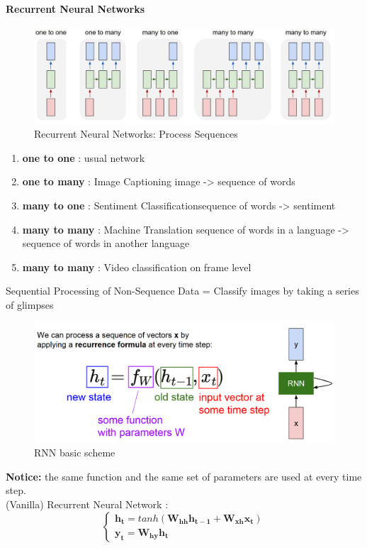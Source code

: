 \documentclass[11pt]{article}
\begin{document}
\paragraph{Recurrent Neural Networks}
\begin{figure}[h]
\centering
\captionsetup{justification=centering}
\includegraphics[width=0.9\linewidth]{L910.pdf}
\caption{ Recurrent Neural Networks: Process Sequences}
\label{fig:L910}
\end{figure}
\begin{enumerate}
    \item \textbf{one to one} : usual network
    \item \textbf{one to many} : Image Captioning image -> sequence of words
    \item \textbf{many to one} : Sentiment Classificationsequence of words -> sentiment
    \item \textbf{many to many} : Machine Translation sequence of words in a language -> sequence of words in another language
    \item \textbf{many to many} : Video classification on frame level
\end{enumerate}{}
Sequential Processing of Non-Sequence Data = Classify images by taking a series of glimpses
\begin{figure}[h]
\centering
\captionsetup{justification=centering}
\includegraphics[width=0.8\linewidth]{L911.pdf}
\caption{ RNN basic scheme}
\label{fig:L911}
\end{figure}
\clearpage
\textbf{Notice: } the same function and the same set of parameters are used at every time step.\\
(Vanilla) Recurrent Neural Network :
\begin{equation}
\begin{cases}
   \mathbf{h_{t}}= tanh(\mathbf{W_{hh}}\mathbf{h_{t-1}}+\mathbf{W_{xh}}\mathbf{x_{t}})\\
   \mathbf{y_{t}}=\mathbf{W_{hy}}\mathbf{h_{t}}
\end{cases}{}
\end{equation}{}
\end{document}

